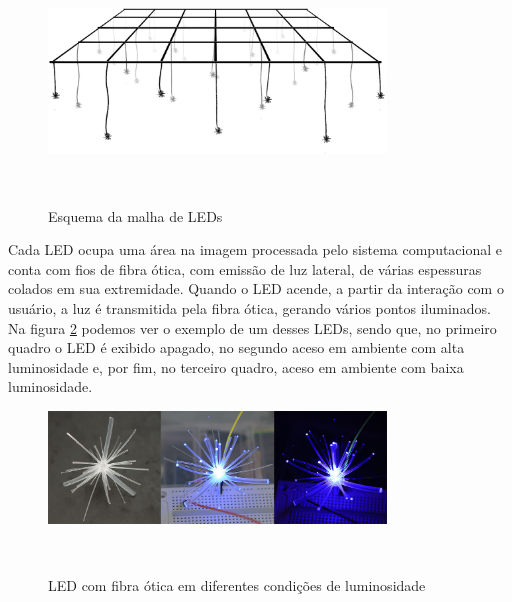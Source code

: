 \begin{figure}[H]
  \begin{center}
    \caption{Esquema da malha de LEDs}
    \vspace*{0,2cm}
    \includegraphics[width=0.8\textwidth]{./04-figuras/malha}
    \label{fig:malha}
  \end{center}
  \vspace*{-0,9cm}
  \\
\end{figure}


Cada LED ocupa uma área na imagem processada pelo sistema computacional e conta com fios de fibra ótica, com emissão de luz lateral, de várias espessuras colados em sua extremidade. Quando o LED acende, a partir da interação com o usuário, a luz é transmitida pela fibra ótica, gerando vários pontos iluminados. Na figura \ref{fig:led_fibra_otica} podemos ver o exemplo de um desses LEDs, sendo que, no primeiro quadro o LED é exibido apagado, no segundo aceso em ambiente com alta luminosidade e, por fim, no terceiro quadro, aceso em ambiente com baixa luminosidade. 

\begin{figure}[H]
  \begin{center}
    \caption{LED com fibra ótica em diferentes condições de luminosidade}
    \vspace*{0,2cm}
    \includegraphics[width=0.8\textwidth]{./04-figuras/led_fibra_otica}
    \label{fig:led_fibra_otica}
  \end{center}
  \vspace*{-0,9cm}
  \\
\end{figure}

